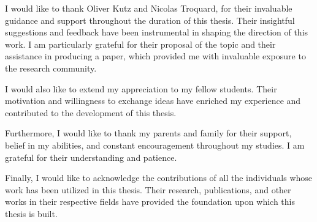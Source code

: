 
I would like to thank Oliver Kutz and Nicolas Troquard, for their invaluable guidance and support throughout the duration of this thesis. Their insightful suggestions and feedback have been instrumental in shaping the direction of this work. I am particularly grateful for their proposal of the topic and their assistance in producing a paper, which provided me with invaluable exposure to the research community.

I would also like to extend my appreciation to my fellow students. Their motivation and willingness to exchange ideas have enriched my experience and contributed to the development of this thesis.

Furthermore, I would like to thank my parents and family for their support, belief in my abilities, and constant encouragement throughout my studies. I am grateful for their understanding and patience.

Finally, I would like to acknowledge the contributions of all the individuals whose work has been utilized in this thesis. Their research, publications, and other works in their respective fields have provided the foundation upon which this thesis is built.
